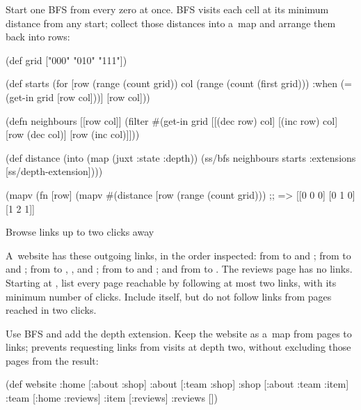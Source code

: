 \smallskip
{} Start one BFS from every zero at once. BFS visits
each cell at its minimum distance from any start; collect those distances
into a~map and arrange them back into rows:

\begtt {}
(def grid ["000" "010" "111"])

(def starts
  (for [row (range (count grid))
        col (range (count (first grid)))
        :when (= \0 (get-in grid [row col]))]
    [row col]))

(defn neighbours [[row col]]
  (filter #(get-in grid %
          [[(dec row) col] [(inc row) col]
           [row (dec col)] [row (inc col)]]))

(def distance
  (into {} (map (juxt :state :depth))
        (ss/bfs neighbours starts
                    {:extensions [ss/depth-extension]})))

(mapv (fn [row]
        (mapv #(distance [row %
      (range (count grid)))
;; => [[0 0 0] [0 1 0] [1 2 1]]
\endtt

\secc Browse links up to two clicks away

 A~website has these outgoing links, in the order
inspected: from  to  and ; from
 to  and ; from  to
, , and ; from  to
 and ; and from  to .
The reviews page has no links. Starting at , list every page
reachable by following at most two links, with its minimum number of clicks.
Include  itself, but do not follow links from pages reached in
two clicks.

\smallskip
{} Use BFS and add the depth extension. Keep the
website as a~map from pages to links;  prevents requesting
links from visits at depth two, without excluding those pages from the result:

\begtt {}
(def website
  {:home [:about :shop]
   :about [:team :shop]
   :shop [:about :team :item]
   :team [:home :reviews]
   :item [:reviews]
   :reviews []})

